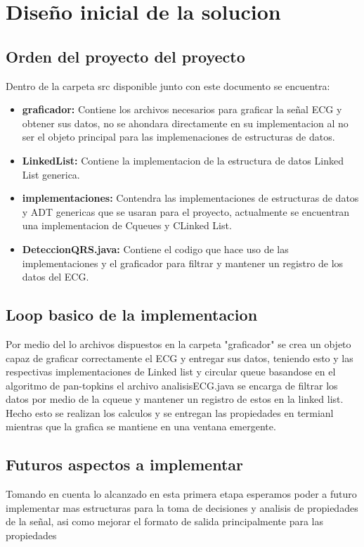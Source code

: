 \section{Diseño inicial de la solucion}
\label{sec:diseño}

\subsection{Orden del proyecto del proyecto}
Dentro de la carpeta src disponible junto con este documento se encuentra:
\begin{itemize}
    \item \textbf{graficador:} Contiene los archivos necesarios para graficar la señal ECG y obtener sus datos, no se ahondara directamente en su implementacion al no ser el objeto principal para las implemenaciones de estructuras de datos.
    \item \textbf{LinkedList:} Contiene la implementacion de la estructura de datos Linked List generica.
    \item \textbf{implementaciones:} Contendra las implementaciones de estructuras de datos y ADT genericas que se usaran para el proyecto, actualmente se encuentran una implementacion de Cqueues y CLinked List.
    \item \textbf{DeteccionQRS.java:} Contiene el codigo que hace uso de las implementaciones y el graficador para filtrar y mantener un registro de los datos del ECG.
\end{itemize}

\subsection{Loop basico de la implementacion}
Por medio del lo archivos dispuestos en la carpeta "graficador" se crea un objeto capaz de graficar correctamente el ECG y entregar sus datos, teniendo esto y las respectivas implementaciones de Linked list y circular queue basandose en el algoritmo de pan-topkins el archivo analisisECG.java se encarga de filtrar los datos por medio de la cqueue
y mantener un registro de estos en la linked list. Hecho esto se realizan los calculos y se entregan las propiedades en termianl mientras que la grafica se mantiene en una ventana emergente. \cite{pt}

\subsection{Futuros aspectos a implementar}
Tomando en cuenta lo alcanzado en esta primera etapa esperamos poder a futuro implementar mas estructuras para la toma de decisiones y analisis de propiedades de la señal, asi como mejorar el formato de salida principalmente para las propiedades
